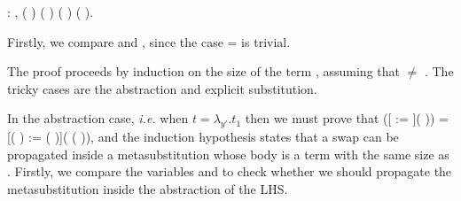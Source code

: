 \begin{coqdoccode}
\coqdocemptyline
\coqdocnoindent
{} : \coqdockw{\ensuremath{\forall}}     ,    (   )   (   ) (   ) (   ).\coqdoceol
\end{coqdoccode}
 Firstly, we compare  and , since the case  =  is trivial.
\begin{coqdoccode}
\end{coqdoccode}
The proof proceeds by induction on the size of the term , assuming that  \ensuremath{\not=} . The tricky cases are the abstraction and explicit substitution. 
\begin{coqdoccode}
\end{coqdoccode}
In the abstraction case, {\it i.e.} when $t = \lambda_{y'}.t_1$ then we must prove that    ([ := ](  )) = [(   ) := (   )](   (  )), and the induction hypothesis states that a swap can be propagated inside a metasubstitution whose body is a term with the same size as . Firstly, we compare the variables  and  to check whether we should propagate the metasubstitution inside the abstraction of the LHS. 
